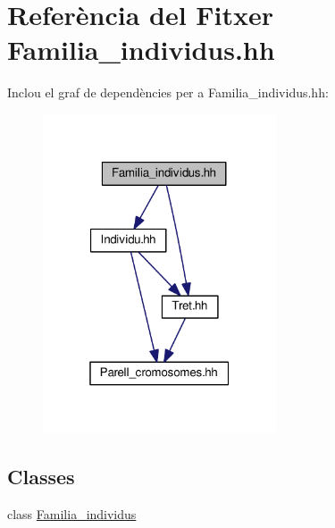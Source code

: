 \hypertarget{_familia__individus_8hh}{}\section{Referència del Fitxer Familia\+\_\+individus.\+hh}
\label{_familia__individus_8hh}
Inclou el graf de dependències per a Familia\+\_\+individus.\+hh\+:
\nopagebreak
\begin{figure}[H]
\begin{center}
\leavevmode
\includegraphics[width=196pt]{_familia__individus_8hh__incl}
\end{center}
\end{figure}
\subsection*{Classes}
\begin{DoxyCompactItemize}
\item 
class \hyperlink{class_familia__individus}{Familia\+\_\+individus}
\end{DoxyCompactItemize}
